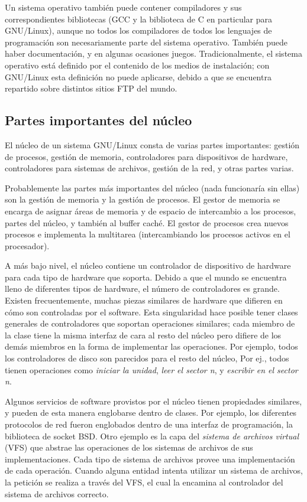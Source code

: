 \documentclass[12pt]{article}
\begin{document}
 Un sistema operativo también puede contener compiladores y sus
correspondientes bibliotecas (GCC y la biblioteca de C en particular para
GNU/Linux), aunque no todos los compiladores de todos los lenguajes de
programación son necesariamente parte del sistema operativo. También puede haber
documentación, y en algunas ocasiones juegos. Tradicionalmente, el sistema
operativo está definido por el contenido de los medios de instalación;
con GNU/Linux esta definición no puede aplicarse, debido a que se encuentra
repartido sobre distintos sitios FTP del mundo.  

\subsection{Partes importantes del núcleo}

El núcleo de un sistema GNU/Linux consta de varias partes importantes:
gestión de procesos, gestión de memoria,  controladores para dispositivos de
hardware, controladores para sistemas de archivos, gestión de la red, y otras
partes varias. 

 Probablemente las partes más importantes del núcleo (nada funcionaría sin
ellas) son la gestión de memoria y la gestión de procesos. El gestor de memoria
se encarga de asignar áreas de memoria y de espacio de intercambio a los
procesos, partes del núcleo, y también al buffer caché. El gestor de
procesos crea nuevos procesos e implementa la multitarea (intercambiando
los procesos activos en el procesador).

A más bajo nivel, el núcleo contiene un controlador de dispositivo de
hardware para cada tipo de hardware que soporta. Debido a que el mundo se
encuentra lleno de diferentes tipos de hardware, el número de controladores es
grande. Existen frecuentemente, muchas piezas similares de hardware que difieren
en cómo son controladas por el software. Esta singularidad hace posible tener
clases generales de controladores que soportan operaciones similares; cada
miembro de la clase tiene la misma interfaz de cara al resto del núcleo pero
difiere de los demás miembros en la forma de implementar las operaciones. Por
ejemplo, todos los controladores de disco son parecidos para el resto del
núcleo, Por ej., todos tienen operaciones como \textit{iniciar la unidad}, 
\textit{leer el sector n}, y \textit{escribir en el sector n}.

 Algunos servicios de software provistos por el núcleo tienen propiedades
similares, y pueden de esta manera englobarse dentro de clases. Por ejemplo, los
diferentes protocolos de red fueron englobados dentro de una interfaz de
programación, la biblioteca de socket BSD. Otro ejemplo es la capa del
\textit{sistema de archivos virtual} (VFS) que abstrae las
operaciones de los sistemas de archivos de sus implementaciones. Cada tipo de
sistema de archivos provee una implementación de cada operación. Cuando alguna
entidad intenta utilizar un sistema de archivos, la petición se realiza a través
del VFS, el cual la encamina al controlador del sistema de archivos correcto.
\end{document}
